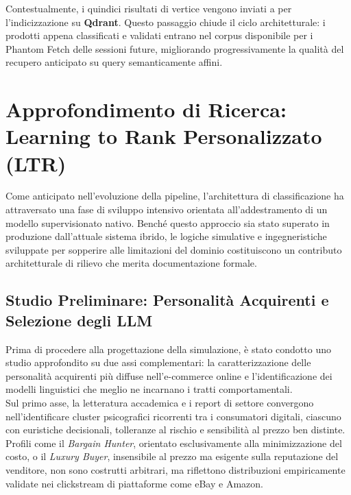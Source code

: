 \noindent
Contestualmente, i quindici risultati di vertice vengono inviati a
 per l'indicizzazione su \textbf{Qdrant}. Questo
passaggio chiude il ciclo architetturale: i prodotti appena classificati e
validati entrano nel corpus disponibile per i Phantom Fetch delle sessioni
future, migliorando progressivamente la qualità del recupero anticipato su
query semanticamente affini.

\section{Approfondimento di Ricerca: Learning to Rank Personalizzato (LTR)}

Come anticipato nell'evoluzione della pipeline, l'architettura di
classificazione ha attraversato una fase di sviluppo intensivo orientata
all'addestramento di un modello supervisionato nativo. Benché questo approccio
sia stato superato in produzione dall'attuale sistema ibrido, le logiche
simulative e ingegneristiche sviluppate per sopperire alle limitazioni del
dominio costituiscono un contributo architetturale di rilievo che merita
documentazione formale.

\subsection*{Studio Preliminare: Personalità Acquirenti e Selezione degli LLM}

Prima di procedere alla progettazione della simulazione, è stato condotto uno
studio approfondito su due assi complementari: la caratterizzazione delle
personalità acquirenti più diffuse nell'e-commerce online e l'identificazione
dei modelli linguistici che meglio ne incarnano i tratti comportamentali.\\

\noindent
Sul primo asse, la letteratura accademica e i report di settore convergono
nell'identificare cluster psicografici ricorrenti tra i consumatori digitali,
ciascuno con euristiche decisionali, tolleranze al rischio e sensibilità al
prezzo ben distinte. Profili come il \textit{Bargain Hunter}, orientato
esclusivamente alla minimizzazione del costo, o il \textit{Luxury Buyer},
insensibile al prezzo ma esigente sulla reputazione del venditore, non sono
costrutti arbitrari, ma riflettono distribuzioni empiricamente validate nei
clickstream di piattaforme come eBay e Amazon.\\

